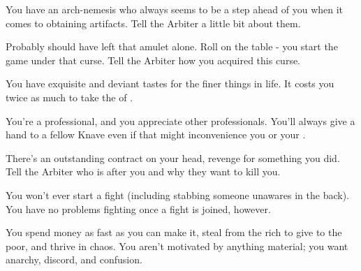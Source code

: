 \begin{multicols*}{2}
 

    \begin{center}
    \end{center}




    
    You have an arch-nemesis who always seems to be a step ahead of you when it comes to obtaining artifacts. Tell the Arbiter a little bit about them.


    Probably should have left that amulet alone. Roll on the  table - you start the game under that curse. Tell the Arbiter how you acquired this curse.


    You have exquisite and deviant tastes for the finer things in life. It costs you twice as much to take the  of .


    You're a professional, and you appreciate other professionals. You'll always give a hand to a fellow Knave even if that might inconvenience you or your .


    There's an outstanding contract on your head, revenge for something you did. Tell the Arbiter who is after you and why they want to kill you.


    You won't ever start a fight (including stabbing someone unawares in the back). You have no problems fighting once a fight is joined, however. 



    You spend money as fast as you can make it, steal from the rich to give to the poor, and thrive in chaos. You aren't motivated by anything material; you want anarchy, discord, and confusion.  


\end{multicols*}
